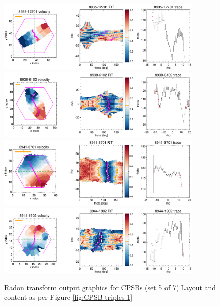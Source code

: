 \documentclass[fleqn,usenatbib]{mnras}
\begin{document}
\begin{figure}
    \centering
    \includegraphics[width=0.88\textwidth]{Images/SN1-MC250/CPSB-triples/CPSB-8935-12701-1-250.png}
    \includegraphics[width=0.88\textwidth]{Images/SN1-MC250/CPSB-triples/CPSB-8938-6102-1-250.png}
    \includegraphics[width=0.88\textwidth]{Images/SN1-MC250/CPSB-triples/CPSB-8941-3701-1-250.png}
    \includegraphics[width=0.88\textwidth]{Images/SN1-MC250/CPSB-triples/CPSB-8944-1902-1-250.png}    
    \caption{Radon transform output graphics for CPSBs (set 5 of 7).Layout and content as per Figure \ref{fig:CPSB-triples-1}}
    \label{fig:CPSB-triples-5}
\end{figure}
\end{document}
